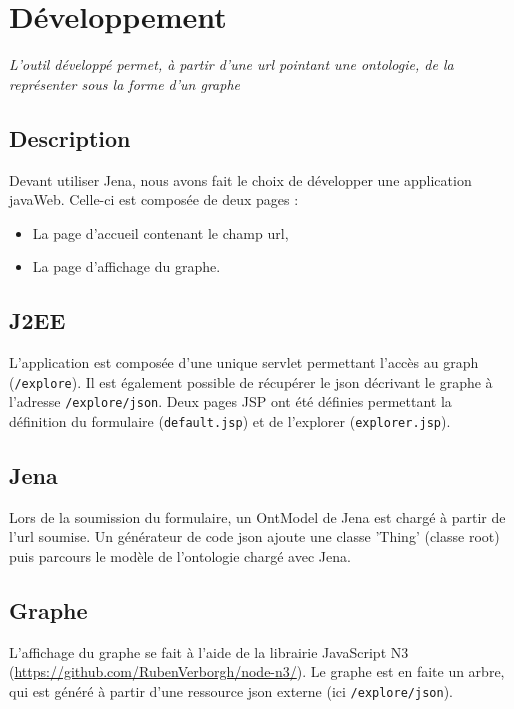 
\section{Développement}

\emph{L'outil développé permet, à partir d'une url pointant une ontologie, de la représenter sous la forme d'un graphe
}

\subsection{Description}

Devant utiliser Jena, nous avons fait le choix de développer une application javaWeb. Celle-ci est composée de deux pages :
\begin{itemize}
    \item La page d'accueil contenant le champ url,
    \item La page d'affichage du graphe.
\end{itemize}

\subsection{J2EE}

L'application est composée d'une unique servlet permettant l'accès au graph (\texttt{/explore}). Il est également possible de récupérer le json décrivant le graphe à l'adresse \texttt{/explore/json}. Deux pages JSP ont été définies permettant la définition du formulaire (\texttt{default.jsp}) et de l'explorer (\texttt{explorer.jsp}).

\subsection{Jena}

Lors de la soumission du formulaire, un OntModel de Jena est chargé à partir de l'url soumise. Un générateur de code json ajoute une classe 'Thing' (classe root) puis parcours le modèle de l'ontologie chargé avec Jena.

\subsection{Graphe}

L'affichage du graphe se fait à l'aide de la librairie JavaScript N3 (\url{https://github.com/RubenVerborgh/node-n3/}). Le graphe est en faite un arbre, qui est généré à partir d'une ressource json externe (ici \texttt{/explore/json}).

